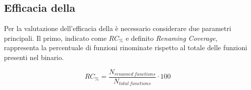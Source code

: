 


\renewcommand{\topfraction}{0.80}  %
\renewcommand{\textfraction}{0.20} %

\begin{table}[t]
    \centering
    \caption[Criteri di valutazione della complessità dei campioni malevoli]{Criteri di valutazione della complessità dei campioni malevoli e relativi intervalli di punteggio. La notazione $\{min,max\}$ indica che il punteggio può assumere esclusivamente i valori $min$ o $max$, mentre $[min,max]$ indica che può assumere qualsiasi valore compreso nell'intervallo.}
    \label{tab:complexity_criteria}
\end{table}

\subsection{Efficacia della \renaming{}} \label{sec:renaming_criteria} %

Per la valutazione dell'efficacia della \renaming{} è necessario considerare due parametri principali. Il primo, indicato come ${RC}_{\%}$ e definito \emph{Renaming Coverage}, rappresenta la percentuale di funzioni rinominate rispetto al totale delle funzioni presenti nel binario.

\begin{equation*}
    {RC}_{\%} = \frac{N_{renamed\ functions}}{N_{total\ functions}} \cdot 100
    \label{eq:renaming_coverage}
\end{equation*}


